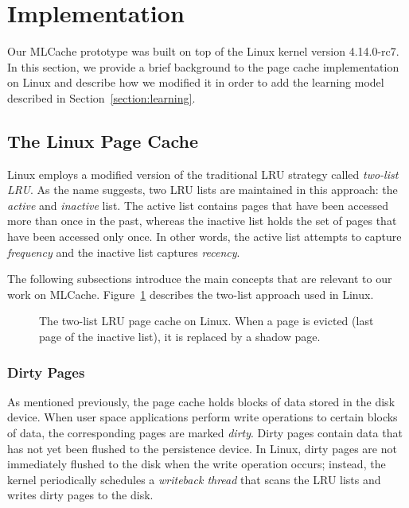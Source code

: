 \section{Implementation}

Our MLCache prototype was built on top of the Linux kernel version 4.14.0-rc7.
In this section, we provide a brief background to the page cache implementation
on Linux and describe how we modified it in order to add the learning model
described in Section~\ref{section:learning}.

\subsection{The Linux Page Cache}

Linux employs a modified version of the traditional LRU strategy called
\emph{two-list LRU}. As the name suggests, two LRU lists are maintained in this
approach: the \emph{active} and \emph{inactive} list. The active list contains
pages that have been accessed more than once in the past, whereas the inactive
list holds the set of pages that have been accessed only once. In other words,
the active list attempts to capture \emph{frequency} and the inactive list
captures \emph{recency}.

The following subsections introduce the main concepts that are relevant to our
work on MLCache. Figure~\ref{fig:lru} describes the two-list approach used in Linux.

\begin{figure}[h]
	\caption{The two-list LRU page cache on Linux. When a page is evicted (last
		page of the inactive list), it is replaced by a shadow page.}
	\label{fig:lru}
\end{figure}

\subsubsection{Dirty Pages}

As mentioned previously, the page cache holds blocks of data stored in the disk
device.  When user space applications perform write operations to certain
blocks of data, the corresponding pages are marked \emph{dirty}. Dirty pages
contain data that has not yet been flushed to the persistence device. In Linux,
dirty pages are not immediately flushed to the disk when the write operation
occurs; instead, the kernel periodically schedules a \emph{ writeback thread}
that scans the LRU lists and writes dirty pages to the disk.

